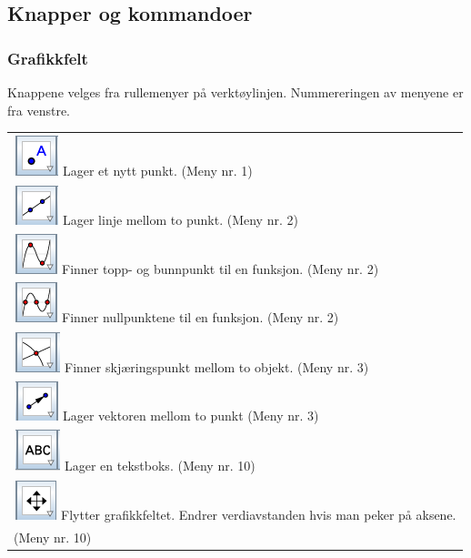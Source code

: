 \subsection{Knapper og kommandoer}
\subsubsection*{Grafikkfelt}
Knappene velges fra rullemenyer på verktøylinjen. Nummereringen av menyene er fra venstre.\vsk

\begin{tabular}{@{}l}
	\,\includegraphics[scale=0.4]{fig/pkt} Lager et nytt punkt. (Meny nr. 1) \\
	\,\includegraphics[scale=0.4]{fig/lin} Lager linje mellom to punkt. (Meny nr. 2)\\	
	\,\includegraphics[scale=0.4]{fig/ekst} Finner topp- og bunnpunkt til en funksjon. (Meny nr. 2)\\
	\,\includegraphics[scale=0.4]{fig/nul} Finner nullpunktene til en funksjon. (Meny nr. 2)	\\
	\,\includegraphics[scale=0.4]{fig/skj} Finner skjæringspunkt mellom to objekt. (Meny nr. 3)\\	
	\,\includegraphics[scale=0.4]{fig/vek} Lager vektoren mellom to punkt (Meny nr. 3)\\		
	\,\includegraphics[scale=0.4]{fig/tekst} Lager en tekstboks. (Meny nr. 10)\\		
	\,\includegraphics[scale=0.4]{fig/flytt} Flytter grafikkfeltet. Endrer verdiavstanden hvis man peker på aksene. \\
	\hspace{1cm}(Meny nr. 10)\\			
\end{tabular}
